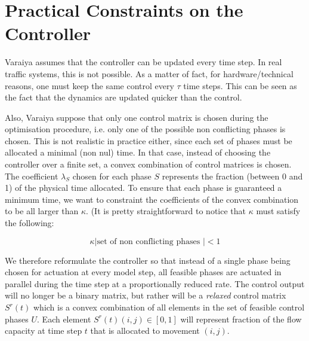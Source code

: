 \section{Practical Constraints on the Controller} \label{sec:constraints}

Varaiya \cite{} assumes that the controller can be updated every time step. 
In real traffic systems, this is not possible. As a matter of fact, for hardware/technical reasons, one must keep the same control every $\tau$ time steps.
This can be seen as the fact that the dynamics are updated quicker than the control.

Also, Varaiya suppose that only one control matrix is chosen during the optimisation procedure, i.e. only one of the possible non conflicting phases is chosen.
This is not realistic in practice either, since each set of phases must be allocated a minimal (non nul) time.
In that case, instead of choosing the controller over a finite  set, a convex combination of control matrices is chosen. 
The coefficient $\lambda_{S}$ chosen for each phase $S$ represents the fraction (between 0 and 1) of the physical time allocated.
To ensure that each phase is guaranteed a minimum time, we want to constraint the coefficients of the convex combination to be all larger than $\kappa$.
(It is pretty straightforward to notice that $\kappa$ must satisfy the following: 

$$
\kappa | \text{set of non conflicting phases } | < 1
$$

We therefore reformulate the controller so that instead of a single phase being chosen for actuation at every model step, all feasible phases are actuated in parallel during the time step at a proportionally reduced rate. The control output will no longer be a binary matrix, but rather will be a \emph{relaxed} control matrix $S^r (t)$ which is a convex combination of all elements in the set of feasible control phases $U$. Each element $S^r (t)(i,j) \in [0,1]$ will represent fraction of the flow capacity at time step $t$ that is allocated to movement $(i,j)$. 